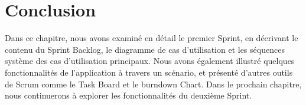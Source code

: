 \section*{Conclusion}
\bigskip
\begin{sloppypar}
  Dans ce chapitre, nous avons examiné en détail le premier Sprint, en décrivant le contenu du Sprint Backlog, le diagramme de cas d'utilisation et les séquences système des cas d'utilisation principaux. Nous avons également illustré quelques fonctionnalités de l'application à travers un scénario, et présenté d'autres outils de Scrum comme le Task Board et le burndown Chart. Dans le prochain chapitre, nous continuerons à explorer les fonctionnalités du deuxième Sprint.
\end{sloppypar}
